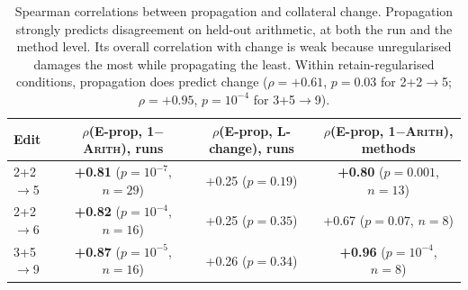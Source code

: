 \begin{table}[t]
    \centering
    \small
    \begin{tabular}{@{}l ccc@{}}
        \toprule
        \textbf{Edit} & $\rho$(E-prop, 1$-$\textsc{Arith}), runs & $\rho$(E-prop, L-change), runs & $\rho$(E-prop, 1$-$\textsc{Arith}), methods \\
        \midrule
        2+2$\to$5 & {\bf +0.81} ($p=10^{-7}$, $n=29$) & +0.25 ($p=0.19$) & {\bf +0.80} ($p=0.001$, $n=13$) \\
        2+2$\to$6 & {\bf +0.82} ($p=10^{-4}$, $n=16$) & +0.25 ($p=0.35$) & +0.67 ($p=0.07$, $n=8$) \\
        3+5$\to$9 & {\bf +0.87} ($p=10^{-5}$, $n=16$) & +0.26 ($p=0.34$) & {\bf +0.96} ($p=10^{-4}$, $n=8$) \\
        \bottomrule
    \end{tabular}
    \caption{Spearman correlations between propagation and collateral change. Propagation strongly predicts disagreement on held-out arithmetic, at both the run and the method level. Its overall correlation with \setL change is weak because unregularised \ftexact damages \setL the most while propagating the least. Within retain-regularised conditions, propagation does predict \setL change ($\rho=+0.61$, $p=0.03$ for 2+2$\to$5; $\rho=+0.95$, $p=10^{-4}$ for 3+5$\to$9).}
    \label{tab:corr}
\end{table}
